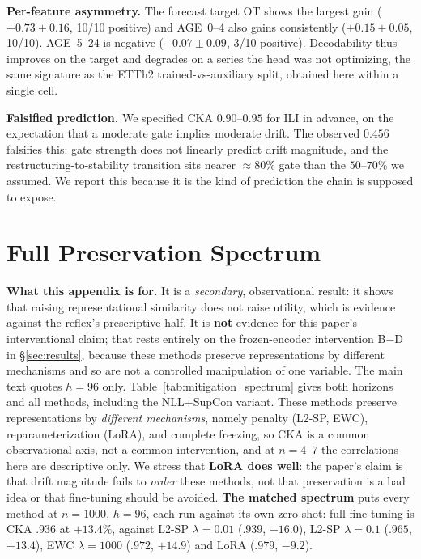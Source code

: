 \documentclass{article}
\begin{document}
\textbf{Per-feature asymmetry.}
The forecast target OT shows the largest gain ($+0.73{\pm}0.16$, 10/10 positive) and AGE~0--4 also gains consistently ($+0.15{\pm}0.05$, 10/10).
AGE~5--24 is negative ($-0.07{\pm}0.09$, 3/10 positive).
Decodability thus improves on the target and degrades on a series the head was not optimizing, the same signature as the ETTh2 trained-vs-auxiliary split, obtained here within a single cell.

\textbf{Falsified prediction.}
We specified CKA $0.90$--$0.95$ for ILI in advance, on the expectation that a moderate gate implies moderate drift.
The observed $0.456$ falsifies this: gate strength does not linearly predict drift magnitude, and the restructuring-to-stability transition sits nearer ${\approx}80\%$ gate than the $50$--$70\%$ we assumed.
We report this because it is the kind of prediction the chain is supposed to expose.

\section{Full Preservation Spectrum}
\label{app:preservation}

\textbf{What this appendix is for.} It is a \emph{secondary}, observational result: it shows that
raising representational similarity does not raise utility, which is evidence against the reflex's
prescriptive half. It is \textbf{not} evidence for this paper's interventional claim; that rests entirely on
the frozen-encoder intervention B$-$D in \S\ref{sec:results}, because these methods preserve
representations by different mechanisms and so are not a controlled manipulation of one variable.
The main text quotes $h{=}96$ only.
Table~\ref{tab:mitigation_spectrum} gives both horizons and all methods, including the NLL+SupCon variant.
These methods preserve representations by \emph{different mechanisms}, namely penalty (L2-SP, EWC), reparameterization (LoRA), and complete freezing, so CKA is a common observational axis, not a common intervention, and at $n{=}4$--$7$ the correlations here are descriptive only. We stress that \textbf{LoRA does well}: the paper's claim is that drift magnitude fails to \emph{order} these methods, not that preservation is a bad idea or that fine-tuning should be avoided.
\textbf{The matched spectrum} puts every method
at $n{=}1000$, $h{=}96$, each run against its own zero-shot: full fine-tuning is CKA $.936$ at
$+13.4\%$, against L2-SP $\lambda{=}0.01$ ($.939$, $+16.0$), L2-SP $\lambda{=}0.1$ ($.965$, $+13.4$),
EWC $\lambda{=}1000$ ($.972$, $+14.9$) and LoRA ($.979$, $-9.2$).
\end{document}
